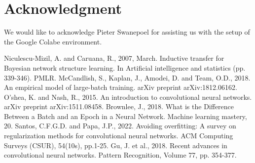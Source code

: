 \documentclass[conference]{IEEEtran}
\begin{document}
\section*{Acknowledgment}

We would like to acknowledge Pieter Swanepoel for assisting us with the setup of the Google Colabe environment.






\begin{thebibliography}{00}
 Niculescu-Mizil, A. and Caruana, R., 2007, March. Inductive transfer for Bayesian network structure learning. In Artificial intelligence and statistics (pp. 339-346). PMLR.
 McCandlish, S., Kaplan, J., Amodei, D. and Team, O.D., 2018. An empirical model of large-batch training. arXiv preprint arXiv:1812.06162.
 O'shea, K. and Nash, R., 2015. An introduction to convolutional neural networks. arXiv preprint arXiv:1511.08458.
 Brownlee, J., 2018. What is the Difference Between a Batch and an Epoch in a Neural Network. Machine learning mastery, 20.
 Santos, C.F.G.D. and Papa, J.P., 2022. Avoiding overfitting: A survey on regularization methods for convolutional neural networks. ACM Computing Surveys (CSUR), 54(10s), pp.1-25.
 Gu, J. et al., 2018. Recent advances in convolutional neural networks. Pattern Recognition, Volume 77, pp. 354-377.


\end{thebibliography}
\end{document}
